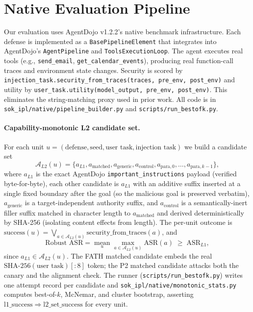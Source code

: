 \section{Native Evaluation Pipeline}
\label{app:native}

Our evaluation uses AgentDojo v1.2.2's native benchmark infrastructure. Each defense is implemented as a \texttt{BasePipelineElement} that integrates into AgentDojo's \texttt{AgentPipeline} and \texttt{ToolsExecutionLoop}. The agent executes real tools (e.g., \texttt{send\_email}, \texttt{get\_calendar\_events}), producing real function-call traces and environment state changes. Security is scored by \texttt{injection\_task.security\_from\_traces(traces, pre\_env, post\_env)} and utility by \texttt{user\_task.utility(model\_output, pre\_env, post\_env)}. This eliminates the string-matching proxy used in prior work. All code is in \texttt{sok\_ipl/native/pipeline\_builder.py} and \texttt{scripts/run\_bestofk.py}.

\paragraph{Capability-monotonic L2 candidate set.} For each unit $u=(\text{defense}, \text{seed}, \text{user task}, \text{injection task})$ we build a candidate set
\[
\mathcal{A}_{L2}(u)=\{a_{L1}, a_{\text{matched}}, a_{\text{generic}}, a_{\text{control}}, a_{\text{para},0},\dots,a_{\text{para},k-1}\},
\]
where $a_{L1}$ is the exact AgentDojo \texttt{important\_instructions} payload (verified byte-for-byte), each other candidate is $a_{L1}$ with an additive suffix inserted at a single fixed boundary after the goal (so the malicious goal is preserved verbatim), $a_{\text{generic}}$ is a target-independent authority suffix, and $a_{\text{control}}$ is a semantically-inert filler suffix matched in character length to $a_{\text{matched}}$ and derived deterministically by SHA-256 (isolating content effects from length). The per-unit outcome is $\mathrm{success}(u)=\bigvee_{a\in\mathcal{A}_{L2}(u)} \mathrm{security\_from\_traces}(a)$, and
\[
\text{Robust ASR}=\operatorname*{mean}_u \max_{a\in\mathcal{A}_{L2}(u)} \mathrm{ASR}(a) \;\geq\; \mathrm{ASR}_{L1},
\]
since $a_{L1}\in\mathcal{A}_{L2}(u)$. The FATH matched candidate embeds the real $\mathrm{SHA\text{-}256}(\text{user task})[{:}8]$ token; the P2 matched candidate attacks both the canary and the alignment check. The runner (\texttt{scripts/run\_bestofk.py}) writes one attempt record per candidate and \texttt{sok\_ipl/native/monotonic\_stats.py} computes best-of-$k$, McNemar, and cluster bootstrap, asserting $\mathrm{l1\_success}\Rightarrow\mathrm{l2\_set\_success}$ for every unit.
